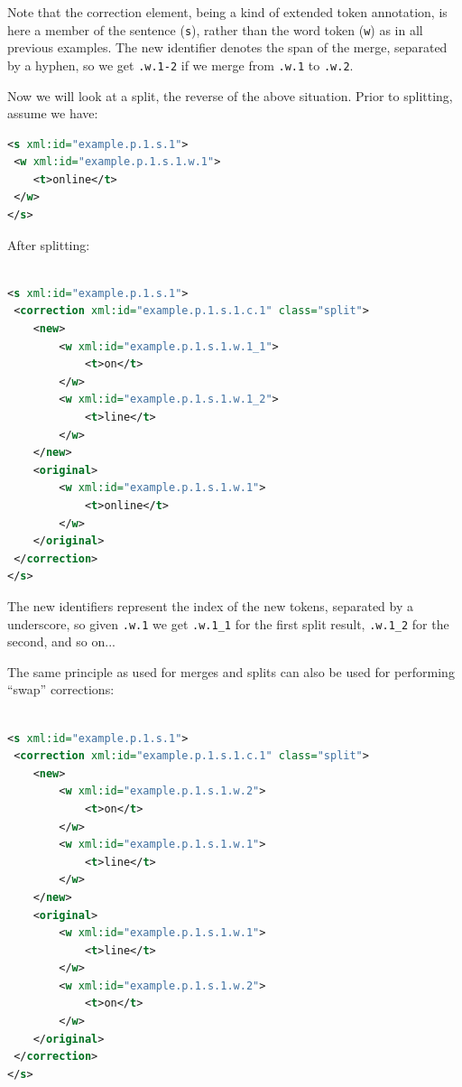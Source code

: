 \documentclass[a4paper,12pt]{report}
\begin{document}
Note that the correction element, being a kind of extended token annotation, is here a member of the sentence (\texttt{s}), rather than the word token (\texttt{w}) as in all previous examples. The new identifier denotes the span of the merge, separated by a hyphen, so we get \texttt{.w.1-2} if we merge from \texttt{.w.1} to \texttt{.w.2}.

Now we will look at a split, the reverse of the above situation. Prior to splitting, assume we have:

\begin{lstlisting}[language=xml]
<s xml:id="example.p.1.s.1">
 <w xml:id="example.p.1.s.1.w.1">
    <t>online</t>
 </w>                         
</s>
\end{lstlisting}

After splitting:

\begin{lstlisting}[language=xml]

<s xml:id="example.p.1.s.1">
 <correction xml:id="example.p.1.s.1.c.1" class="split">
    <new>    
        <w xml:id="example.p.1.s.1.w.1_1">
            <t>on</t>
        </w>
        <w xml:id="example.p.1.s.1.w.1_2">
            <t>line</t>
        </w>                        
    </new>
    <original>
        <w xml:id="example.p.1.s.1.w.1">
            <t>online</t>
        </w>
    </original>
 </correction>               
</s>
\end{lstlisting}

The new identifiers represent the index of the new tokens, separated by a underscore, so given \texttt{.w.1}  we get \texttt{.w.1\_1} for the first split result, \texttt{.w.1\_2} for the second, and so on...

The same principle as used for merges and splits can also be used for performing ``swap'' corrections:

\begin{lstlisting}[language=xml]

<s xml:id="example.p.1.s.1">
 <correction xml:id="example.p.1.s.1.c.1" class="split">
    <new>    
        <w xml:id="example.p.1.s.1.w.2">
            <t>on</t>
        </w>
        <w xml:id="example.p.1.s.1.w.1">
            <t>line</t>
        </w>
    </new>
    <original>
        <w xml:id="example.p.1.s.1.w.1">
            <t>line</t>
        </w>
        <w xml:id="example.p.1.s.1.w.2">
            <t>on</t>
        </w>
    </original>
 </correction>               
</s>
\end{lstlisting}
\end{document}
